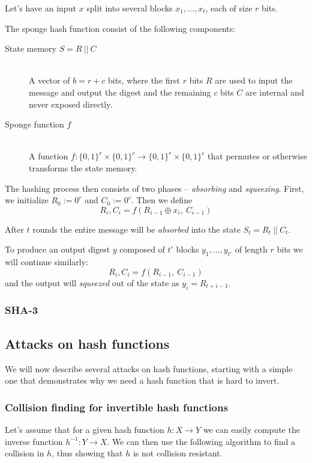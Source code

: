 Let's have an input $x$ split into several blocks $x_1, \dots, x_t$, each of size $r$ bits.

The sponge hash function consist of the following components:
\begin{description}
\item[State memory $S = R ~||~ C$] \hfill \\
A vector of $b = r+c$ bits, where the first $r$ bits $R$ are used to input the message and output the digest and the remaining $c$ bits $C$ are internal and never exposed directly.
\item[Sponge function $f$] \hfill \\
A function $f: \{0,1\}^r\times\{0,1\}^c \to \{0,1\}^r\times\{0,1\}^c$ that permutes or otherwise transforms the state memory.
\end{description}

The hashing process then consists of two phases -- \emph{absorbing} and \emph{squeezing}.
First, we initialize $R_0 := 0^r$ and $C_0 := 0^c$. Then we define
\[
R_i, C_i = f(R_{i-1} \oplus x_i,~ C_{i-1})
\]

After $t$ rounds the entire message will be \emph{absorbed} into the state $S_t = R_t ~||~ C_t$.

To produce an output digest $y$ composed of $t'$ blocks $y_1, \dots, y_{t'}$ of length $r$ bits we will continue similarly:
\[
R_i, C_i = f(R_{i-1},~ C_{i-1})
\]
and the output will \emph{squeezed} out of the state as $y_i = R_{t+i-1}$.

\subsubsection{SHA-3}

\subsection{Attacks on hash functions}

We will now describe several attacks on hash functions, starting with a simple one that demonstrates why we need a hash function that is hard to invert.

\subsubsection{Collision finding for invertible hash functions}

Let's assume that for a given hash function $h: X \to Y$ we can easily compute the inverse function $h^{-1}: Y \to X$.
We can then use the following algorithm to find a collision in $h$, thus showing that $h$ is not collision resistant.


